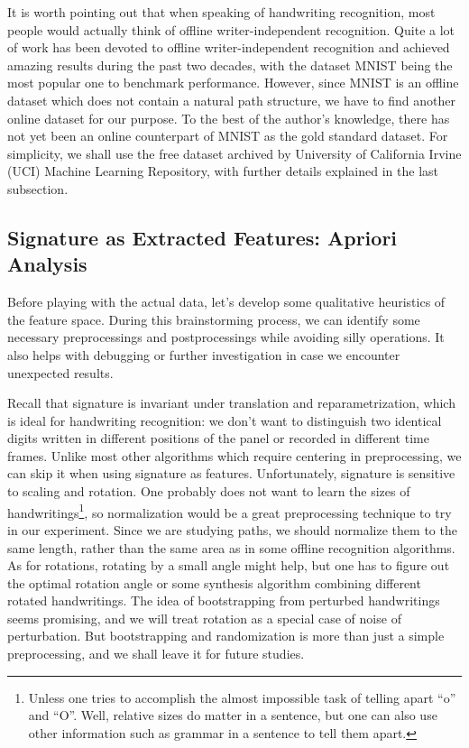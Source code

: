 \documentclass[fleqn]{article}
\theoremstyle{definition}
\theoremstyle{remark}
\begin{document}
\par
It is worth pointing out that when speaking of handwriting recognition, most people would actually think of offline writer-independent recognition. Quite a lot of work has been devoted to offline writer-independent recognition and achieved amazing results during the past two decades, with the dataset MNIST\cite{mnist} being the most popular one to benchmark performance. However, since MNIST is an offline dataset which does not contain a natural path structure, we have to find another online dataset for our purpose. To the best of the author's knowledge, there has not yet been an online counterpart of MNIST as the gold standard dataset. For simplicity, we shall use the free dataset archived by University of California Irvine (UCI) Machine Learning Repository, with further details explained in the last subsection.

\subsection{Signature as Extracted Features: Apriori Analysis}
Before playing with the actual data, let's develop some qualitative heuristics of the feature space. During this brainstorming process, we can identify some necessary preprocessings and postprocessings while avoiding silly operations. It also helps with debugging or further investigation in case we encounter unexpected results.

\par
Recall that signature is invariant under translation and reparametrization, which is ideal for handwriting recognition: we don't want to distinguish two identical digits written in different positions of the panel or recorded in different time frames. Unlike most other algorithms which require centering in preprocessing, we can skip it when using signature as features. Unfortunately, signature is sensitive to scaling and rotation. One probably does not want to learn the sizes of handwritings\footnote{Unless one tries to accomplish the almost impossible task of telling apart ``o'' and ``O''. Well, relative sizes do matter in a sentence, but one can also use other information such as grammar in a sentence to tell them apart.}, so normalization would be a great preprocessing technique to try in our experiment. Since we are studying paths, we should normalize them to the same length, rather than the same area as in some offline recognition algorithms. As for rotations, rotating by a small angle might help, but one has to figure out the optimal rotation angle or some synthesis algorithm combining different rotated handwritings. The idea of bootstrapping from perturbed handwritings seems promising, and we will treat rotation as a special case of noise of perturbation. But bootstrapping and randomization is more than just a simple preprocessing, and we shall leave it for future studies.
\end{document}
